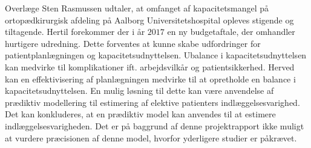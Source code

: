 Overlæge Sten Rasmussen udtaler, at omfanget af kapacitetsmangel på ortopædkirurgisk afdeling på Aalborg Universitetshospital opleves stigende og tiltagende. Hertil forekommer der i år $2017$ en ny budgetaftale, der omhandler hurtigere udredning. Dette forventes at kunne skabe udfordringer for patientplanlægningen og kapacitetsudnyttelsen. Ubalance i kapacitetsudnyttelsen kan medvirke til komplikationer ift. arbejdsvilkår og patientsikkerhed. Herved kan en effektivisering af planlægningen medvirke til at opretholde en balance i kapacitetsudnyttelsen. En mulig løsning til dette kan være anvendelse af prædiktiv modellering til estimering af elektive patienters indlæggelsesvarighed. Det kan konkluderes, at en prædiktiv model kan anvendes til at estimere indlæggelsesvarigheden. Det er på baggrund af denne projektrapport ikke muligt at vurdere præcisionen af denne model, hvorfor yderligere studier er påkrævet.